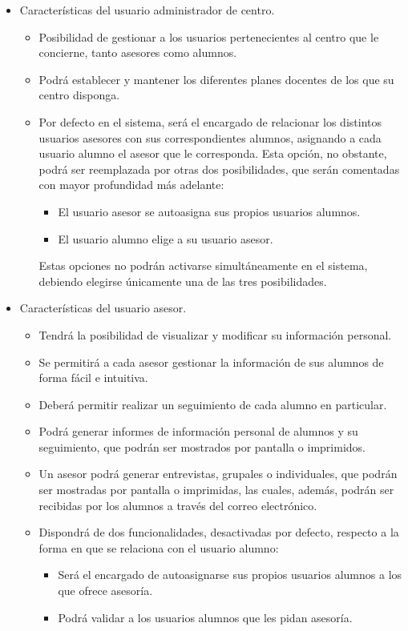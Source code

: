 \begin{itemize}
   \item Características del usuario administrador de centro.
      \begin{itemize}
       \item Posibilidad de gestionar a los usuarios pertenecientes al centro
             que le concierne, tanto asesores como alumnos.
       \item Podrá establecer y mantener los diferentes planes docentes de los
             que su centro disponga.
       \item Por defecto en el sistema, será el encargado de relacionar los
             distintos usuarios asesores con sus correspondientes alumnos,
             asignando a cada usuario alumno el asesor que le corresponda. Esta
             opción, no obstante, podrá ser reemplazada por otras dos
             posibilidades, que serán comentadas con mayor profundidad más
             adelante:
             \begin{itemize}
               \item El usuario asesor se autoasigna sus propios
                     usuarios alumnos.
               \item El usuario alumno elige a su usuario asesor.
             \end{itemize}
             Estas opciones no podrán activarse simultáneamente en el sistema,
             debiendo elegirse únicamente una de las tres posibilidades.
      \end{itemize}

   \item Características del usuario asesor.
      \begin{itemize}
         \item Tendrá la posibilidad de visualizar y modificar su información
         personal.
         \item Se permitirá a cada asesor gestionar la información de sus
         alumnos de forma fácil e intuitiva.
         \item Deberá permitir realizar un seguimiento de cada alumno en
         particular.
         \item Podrá generar informes de información personal de alumnos y su
         seguimiento, que podrán ser mostrados por pantalla o imprimidos.
         \item Un asesor podrá generar entrevistas, grupales o individuales, que
         podrán ser mostradas por pantalla o imprimidas, las cuales, además,
         podrán ser recibidas por los alumnos a través del correo electrónico.
         \item Dispondrá de dos funcionalidades, desactivadas por defecto,
         respecto a la forma en que se relaciona con el usuario alumno:
         \begin{itemize}
            \item Será el encargado de autoasignarse sus propios usuarios
            alumnos a los que ofrece asesoría.
            \item Podrá validar a los usuarios alumnos que les pidan asesoría.
         \end{itemize}
      \end{itemize}


\end{itemize}
